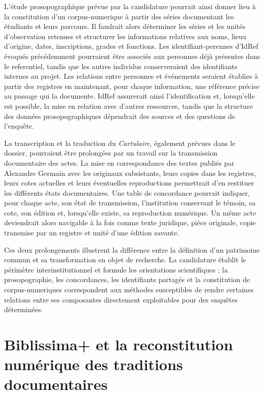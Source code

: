 L'étude prosopographique prévue par la candidature pourrait ainsi donner lieu à la constitution d'un \gls{corpus-numerique} à partir des séries documentant les étudiants et leurs parcours. Il faudrait alors déterminer les séries et les unités d'observation retenues et structurer les informations relatives aux noms, lieux d'origine, dates, inscriptions, grades et fonctions. Les \glspl{identifiant-perenne} d'IdRef évoqués précédemment pourraient être associés aux personnes déjà présentes dans le \gls{referentiel}, tandis que les autres individus conserveraient des identifiants internes au projet. Les relations entre personnes et événements seraient établies à partir des registres en maintenant, pour chaque information, une référence précise au passage qui la documente. IdRef assurerait ainsi l'identification et, lorsqu'elle est possible, la mise en relation avec d'autres ressources, tandis que la structure des données prosopographiques dépendrait des sources et des questions de l'enquête.

La transcription et la traduction du \emph{Cartulaire}, également prévues dans le dossier, pourraient être prolongées par un travail sur la transmission documentaire des actes. La mise en correspondance des textes publiés par Alexandre Germain avec les originaux subsistants, leurs copies dans les registres, leurs cotes actuelles et leurs éventuelles reproductions permettrait d'en restituer les différents états documentaires. Une table de concordance pourrait indiquer, pour chaque acte, son état de transmission, l'institution conservant le témoin, sa cote, son édition et, lorsqu'elle existe, sa reproduction numérique. Un même acte deviendrait alors navigable à la fois comme texte juridique, pièce originale, copie transmise par un registre et unité d'une édition savante.

Ces deux prolongements illustrent la différence entre la définition d'un patrimoine commun et sa transformation en objet de recherche. La candidature établit le périmètre interinstitutionnel et formule les orientations scientifiques ; la prosopographie, les concordances, les identifiants partagés et la constitution de \glspl{corpus-numerique} correspondent aux méthodes susceptibles de rendre certaines relations entre ses composantes directement exploitables pour des enquêtes déterminées.


\section{Biblissima+ et la reconstitution numérique des traditions documentaires}

